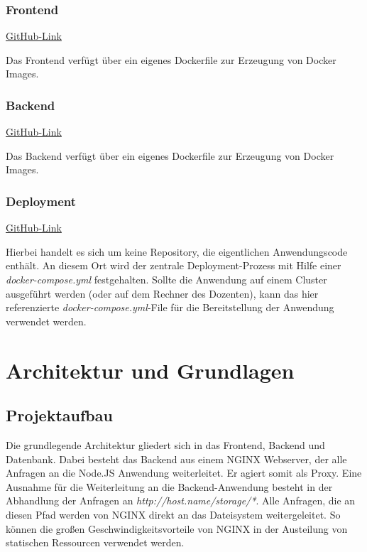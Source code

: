 \documentclass[12pt,a4paper]{report}
\begin{document}
\subsection*{Frontend}
\href{https://github.com/felixwaldbach/travelposterfrontend}{GitHub-Link}

Das Frontend verfügt über ein eigenes Dockerfile zur Erzeugung von Docker Images.

\subsection*{Backend}
\href{https://github.com/felixwaldbach/travelposter}{GitHub-Link}

Das Backend verfügt über ein eigenes Dockerfile zur Erzeugung von Docker Images.

\subsection*{Deployment}
\href{https://github.com/mariuskiessling/travelposter-deployment}{GitHub-Link}

Hierbei handelt es sich um keine Repository, die eigentlichen Anwendungscode enthält. An diesem Ort wird der zentrale Deployment-Prozess mit Hilfe einer \textit{docker-compose.yml} festgehalten. Sollte die Anwendung auf einem Cluster ausgeführt werden (oder auf dem Rechner des Dozenten), kann das hier referenzierte \textit{docker-compose.yml}-File für die Bereitstellung der Anwendung verwendet werden.

\newpage
\chapter{Architektur und Grundlagen}

\section{Projektaufbau}

Die grundlegende  Architektur gliedert sich in das Frontend, Backend und Datenbank. Dabei besteht das Backend aus einem NGINX Webserver, der alle Anfragen an die Node.JS Anwendung weiterleitet. Er agiert somit als Proxy. Eine Ausnahme für die Weiterleitung an die Backend-Anwendung besteht in der Abhandlung der Anfragen an \textit{http://host.name/storage/*}. Alle Anfragen, die an diesen Pfad werden von NGINX direkt an das Dateisystem weitergeleitet. So können die großen Geschwindigkeitsvorteile von NGINX in der Austeilung von statischen Ressourcen verwendet werden.
\end{document}
